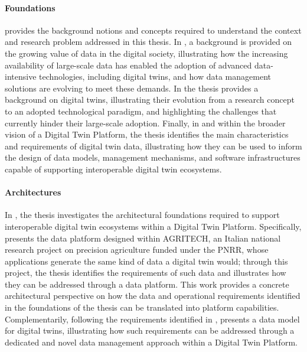 \paragraph{Foundations}
 provides the background notions and concepts required to understand the context and research problem addressed in this thesis.
%
In , a background is provided on the growing value of data in the digital society, illustrating how the increasing availability of large-scale data has enabled the adoption of advanced data-intensive technologies, including digital twins, and how data management solutions are evolving to meet these demands.
%
In  the thesis provides a background on digital twins, illustrating their evolution from a research concept to an adopted technological paradigm, and highlighting the challenges that currently hinder their large-scale adoption.
%
Finally, in  and within the broader vision of a Digital Twin Platform, the thesis identifies the main characteristics and requirements of digital twin data, illustrating how they can be used to inform the design of data models, management mechanisms, and software infrastructures capable of supporting interoperable digital twin ecosystems.

\paragraph{Architectures}
In , the thesis investigates the architectural foundations required to support interoperable digital twin ecosystems within a Digital Twin Platform.
%
Specifically,  presents the data platform designed within AGRITECH, an Italian national research project on precision agriculture funded under the PNRR, whose applications generate the same kind of data a digital twin would; through this project, the thesis identifies the requirements of such data and illustrates how they can be addressed through a data platform.
%
This work provides a concrete architectural perspective on how the data and operational requirements identified in the foundations of the thesis can be translated into platform capabilities.
%
Complementarily, following the requirements identified in ,  presents a data model for digital twins, illustrating how such requirements can be addressed through a dedicated and novel data management approach within a Digital Twin Platform.

